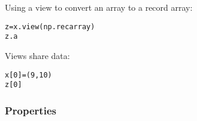 \begin{boxedminipage}{\textwidth}
Using a view to convert an array to a record array:
\begin{alltt}
\pysrcprompt{{\textgreater}{\textgreater}{\textgreater} }z = x.view(np.recarray)
\pysrcprompt{{\textgreater}{\textgreater}{\textgreater} }z.a
\end{alltt}

Views share data:
\begin{alltt}
\pysrcprompt{{\textgreater}{\textgreater}{\textgreater} }x[0] = (9, 10)
\pysrcprompt{{\textgreater}{\textgreater}{\textgreater} }z[0]
\end{alltt}
    \vspace{1ex}

    \end{boxedminipage}



  \subsubsection{Properties}

